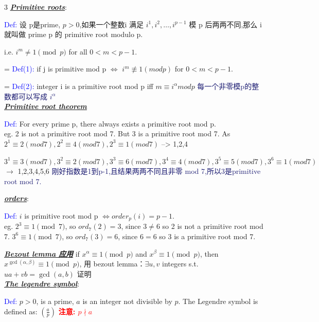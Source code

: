 \documentclass[12pt]{article}
\newcommand{\bulletPoint}[1]{\underline{\textit{\textbf{#1}}}}
\begin{document}
\begin{multicols*}{3}
\bulletPoint{Primitive roots}:

\textcolor{blue}{Def:} 设 p是prime, $p>0$,如果一个整数i 满足 $i^1, i^2, \ldots, i^{p-1}$ 模 p 后两两不同,那么 i 就叫做 prime p 的 primitive 
root modulo p.


i.e. $i^m \neq 1 \pmod p$ for all $0 <m < p-1$.

= \textcolor{blue}{Def(1):} if j is primitive mod p $\Longleftrightarrow$ $i^m \not\equiv 1 (mod p)$ for $0<m<p-1.$

= \textcolor{blue}{Def(2):} integer i is a primitive root mod p iff $m\equiv i^\alpha mod p$ 
{\fontsize{5.5pt}{5pt}\selectfont\textcolor{MidnightBlue}{每一个非零模p的整数都可以写成 $i^{\alpha}$}} \\[2pt]

\bulletPoint{Primitive root theorem}

\textcolor{blue}{Def:} For every prime p, there always exists a primitive root mod p.\\[2pt]

eg. 2 is not a primitive root mod 7. But 3 is a primitive root mod 7. As
$2^1\equiv 2(mod 7), 2^2\equiv 4 (mod 7), 2^3\equiv 1 (mod 7)$ --> 1,2,4

$3^1\equiv 3(mod 7), 3^2\equiv 2 (mod 7), 3^3\equiv 6 (mod 7), 3^4\equiv 4 (mod 7), 3^5\equiv 5 (mod 7), 3^6\equiv 1 (mod 7)$ $\rightarrow$ 1,2,3,4,5,6 
 {\fontsize{5.5pt}{5pt}\selectfont \textcolor{MidnightBlue}{刚好指数是1到p-1,且结果两两不同且非零 mod 7,所以3是primitive root mod 7.}}

\bulletPoint{orders}:

\textcolor{blue}{Def:} $i$ is primitive root mod p $\Longleftrightarrow order_{p}(i)=p-1.$ \\[2pt]

eg. $2^3 \equiv 1 \pmod{7}$, so $ord_7(2)=3$, since $3\neq 6$ so 2 is not a primitive root mod 7. $3^6 \equiv 1 \pmod{7}$, so $ord_7(3)=6$, 
since $6=6$ so 3 is a primitive root mod 7. 

\bulletPoint{Bezout lemma 应用}
\textcolor{magenta!90!black}{if $x^ \alpha \equiv 1 \pmod{p}$ and $x^ \beta \equiv 1 \pmod{p}$, then $x^{\gcd(\alpha,\beta)} \equiv 1 \pmod{p}$, 
{\fontsize{5.5pt}{5pt}\selectfont 用 bezout lemma：$\exists u,v$ integers s.t. $ua + vb = \gcd(a,b)$ 证明 }} \\[2pt]



\bulletPoint{The legendre symbol}:

\textcolor{blue}{Def:} $p>0$, is a prime, $a$ is an integer not divisible by $p$. The Legendre symbol is defined as: $\left(\frac{a}{p}\right)$ 
\textcolor{red}{\textbf{注意: $p\nmid a$}}


\end{multicols*}
\end{document}

